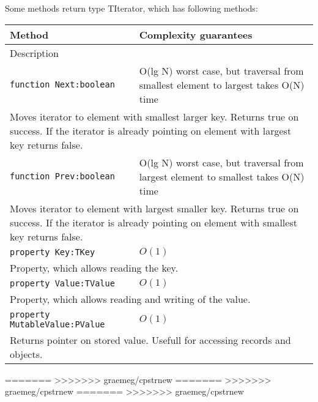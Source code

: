 Some methods return type TIterator, which has following methods:
\begin{longtable}{|m{10cm}|m{5cm}|}                                                             
\hline
Method & Complexity guarantees \\ \hline                                                  
\multicolumn{2}{|m{15cm}|}{Description} \\ \hline\hline                                               
\verb!function Next:boolean! & O(lg N) worst case, but traversal from smallest element to
largest takes O(N) time \\\hline
\multicolumn{2}{|m{15cm}|}{Moves iterator to element with smallest larger key. Returns true on
success. If the iterator is already pointing on element with largest key returns false.} \\\hline\hline

\verb!function Prev:boolean! & O(lg N) worst case, but traversal from largest element to
smallest takes O(N) time \\\hline
\multicolumn{2}{|m{15cm}|}{Moves iterator to element with largest smaller key. Returns true on
success. If the iterator is already pointing on element with smallest key returns false.} \\\hline\hline

\verb!property Key:TKey! & $O(1)$ \\\hline
\multicolumn{2}{|m{15cm}|}{Property, which allows reading the key.} \\\hline

\verb!property Value:TValue! & $O(1)$ \\\hline
\multicolumn{2}{|m{15cm}|}{Property, which allows reading and writing of the value.} \\\hline
\verb!property MutableValue:PValue! & $O(1)$ \\\hline
\multicolumn{2}{|m{15cm}|}{Returns pointer on stored value. Usefull for accessing records and
objects.} \\\hline


\end{longtable}
=======
>>>>>>> graemeg/cpstrnew
=======
>>>>>>> graemeg/cpstrnew
=======
>>>>>>> graemeg/cpstrnew
